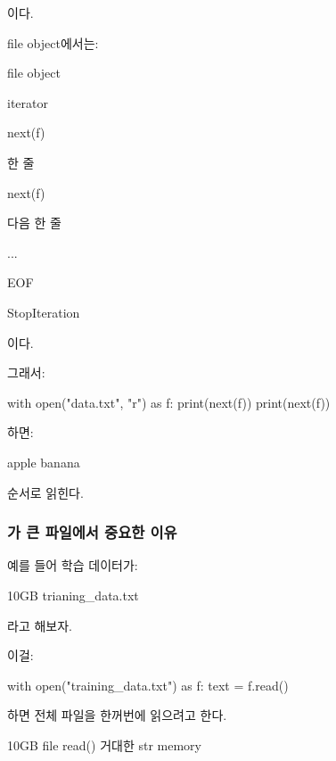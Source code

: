 이다.

file object에서는:

\begin{dhksmry}[centered]
file object

\da

iterator

\da

next(f)

\da

한 줄

\da

next(f)

\da

다음 한 줄

\da

...

\da

EOF

\da

StopIteration
\end{dhksmry}

이다.

그래서:

\begin{dhkcode}
with open("data.txt", "r") as f:
    print(next(f))
    print(next(f))
\end{dhkcode}

하면:

\begin{dhkzsh}
apple
banana
\end{dhkzsh}

순서로 읽힌다.

\subsubsection{가 큰 파일에서 중요한 이유}

예를 들어 학습 데이터가:

\begin{dhkzsh}
10GB trianing_data.txt
\end{dhkzsh}

라고 해보자.

이걸:

\begin{dhkcode}
with open("training_data.txt") as f:
    text = f.read()
\end{dhkcode}

하면 전체 파일을 한꺼번에 읽으려고 한다.

\begin{dhksmry}[centered]
10GB file
\da
read()
\da
거대한 str
\da
memory
\end{dhksmry}

